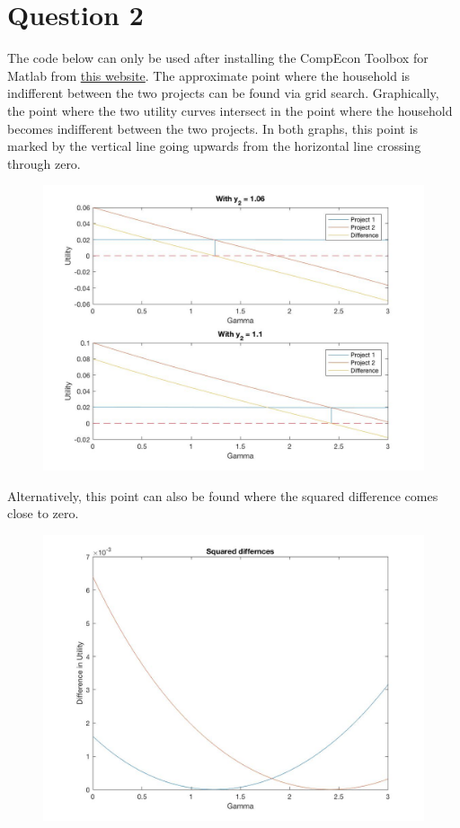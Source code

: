 \documentclass{article}
\begin{document}
\section{Question 2}
The code below can only be used after installing the CompEcon Toolbox for Matlab from \href{http://www4.ncsu.edu/~pfackler/compecon/toolbox.html}{this website}.
%
The approximate point where the household is indifferent between the two projects can be found via grid search. Graphically, the point where the two utility curves intersect in the point where the household becomes indifferent between the two projects. In both graphs, this point is marked by the vertical line going upwards from the horizontal line crossing through zero.
\begin{figure}[h]
\includegraphics[width = \textwidth, keepaspectratio]{PS5Q2Sub3_Utility.jpg} 
\end{figure}
Alternatively, this point can also be found where the squared difference comes close to zero. \begin{figure}[h]
\includegraphics[width = \textwidth, keepaspectratio]{PS5Q2Sub3_Squared_Diff.jpg}
\end{figure}
\end{document}
